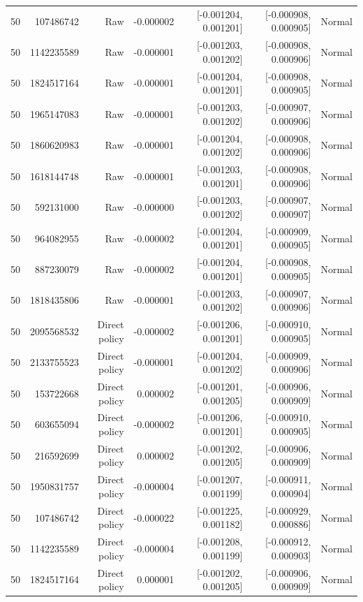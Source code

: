 \begin{longtable}{lrrrrrr}
50 & 107486742 & Raw & -0.000002 & [-0.001204, 0.001201] & [-0.000908, 0.000905] & Normal \\
50 & 1142235589 & Raw & -0.000001 & [-0.001203, 0.001202] & [-0.000908, 0.000906] & Normal \\
50 & 1824517164 & Raw & -0.000001 & [-0.001204, 0.001201] & [-0.000908, 0.000905] & Normal \\
50 & 1965147083 & Raw & -0.000001 & [-0.001203, 0.001202] & [-0.000907, 0.000906] & Normal \\
50 & 1860620983 & Raw & -0.000001 & [-0.001204, 0.001202] & [-0.000908, 0.000906] & Normal \\
50 & 1618144748 & Raw & -0.000001 & [-0.001203, 0.001201] & [-0.000908, 0.000906] & Normal \\
50 & 592131000 & Raw & -0.000000 & [-0.001203, 0.001202] & [-0.000907, 0.000907] & Normal \\
50 & 964082955 & Raw & -0.000002 & [-0.001204, 0.001201] & [-0.000909, 0.000905] & Normal \\
50 & 887230079 & Raw & -0.000002 & [-0.001204, 0.001201] & [-0.000908, 0.000905] & Normal \\
50 & 1818435806 & Raw & -0.000001 & [-0.001203, 0.001202] & [-0.000907, 0.000906] & Normal \\
50 & 2095568532 & Direct policy & -0.000002 & [-0.001206, 0.001201] & [-0.000910, 0.000905] & Normal \\
50 & 2133755523 & Direct policy & -0.000001 & [-0.001204, 0.001202] & [-0.000909, 0.000906] & Normal \\
50 & 153722668 & Direct policy & 0.000002 & [-0.001201, 0.001205] & [-0.000906, 0.000909] & Normal \\
50 & 603655094 & Direct policy & -0.000002 & [-0.001206, 0.001201] & [-0.000910, 0.000905] & Normal \\
50 & 216592699 & Direct policy & 0.000002 & [-0.001202, 0.001205] & [-0.000906, 0.000909] & Normal \\
50 & 1950831757 & Direct policy & -0.000004 & [-0.001207, 0.001199] & [-0.000911, 0.000904] & Normal \\
50 & 107486742 & Direct policy & -0.000022 & [-0.001225, 0.001182] & [-0.000929, 0.000886] & Normal \\
50 & 1142235589 & Direct policy & -0.000004 & [-0.001208, 0.001199] & [-0.000912, 0.000903] & Normal \\
50 & 1824517164 & Direct policy & 0.000001 & [-0.001202, 0.001205] & [-0.000906, 0.000909] & Normal \\

\end{longtable}
